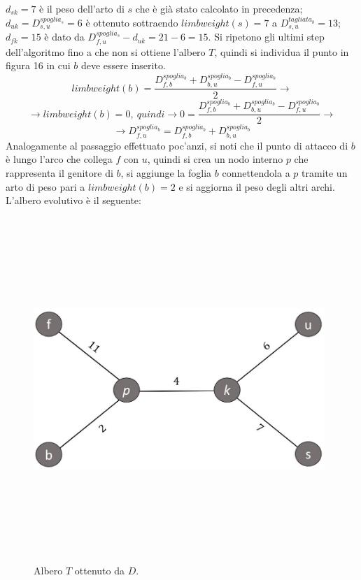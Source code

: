$d_{sk}=7$ è il peso dell'arto di $s$ che è già stato calcolato in precedenza; $d_{uk}=D^{spoglia_{s}}_{s,u}=6$ è ottenuto sottraendo $limbweight(s)=7$ a \newline $D^{tagliata_{b}}_{s,u}=13$; $d_{fk}=15$ è dato da $D^{spoglia_{s}}_{f,u}-d_{uk}=21-6=15$.
\newline
Si ripetono gli ultimi step dell'algoritmo fino a che non si ottiene l'albero $T$, quindi si individua il punto in figura 16 in cui $b$ deve essere inserito.
\[
limbweight(b)=\frac{D^{spoglia_{b}}_{f,b}+D^{spoglia_{b}}_{b,u}-D^{spoglia_{b}}_{f,u}}{2} \rightarrow\]
\[ \rightarrow limbweight(b)=0,\: quindi\rightarrow 0=\frac{D^{spoglia_{b}}_{f,b}+D^{spoglia_{b}}_{b,u}-D^{spoglia_{b}}_{f,u}}{2}\rightarrow\]
\[\rightarrow D^{spoglia_{b}}_{f,u}=D^{spoglia_{b}}_{f,b}+D^{spoglia_{b}}_{b,u}
\]
Analogamente al passaggio effettuato poc'anzi, si noti che il punto di attacco di $b$ è lungo l'arco che collega $f$ con $u$, quindi si crea un nodo interno $p$ che rappresenta il genitore di $b$,
si aggiunge la foglia $b$ connettendola a $p$ tramite un arto di peso pari a
$limbweight(b)=2$ e si aggiorna il peso degli altri archi.
\newpage
L'albero evolutivo è il seguente:
\begin{figure}[h!]
\centering
	\includegraphics[height=13cm, width=11cm, keepaspectratio]{additive_tree_4.jpg}
 	\caption{Albero $T$ ottenuto da $D$.}
  	\label{fig:additivePhylogeny_4}
\end{figure}
